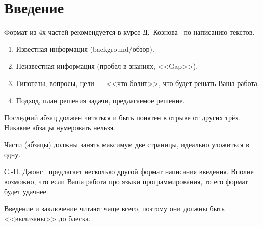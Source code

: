 
\section*{Введение}
\thispagestyle{withCompileDate}

Формат из 4х частей рекомендуется в курсе Д.~Кознова~\cite{koznov} по написанию текстов.

\begin{enumerate}
    \item Известная информация (background/обзор).
    \item Неизвестная информация (пробел в знаниях, <<Gap>>).
    \item Гипотезы, вопросы, цели --- <<что болит>>, что будет решать Ваша работа.
    \item Подход, план решения задачи, предлагаемое решение.
\end{enumerate}

Последний абзац должен читаться и быть понятен в отрыве от других трёх. Никакие абзацы нумеровать нельзя.

Части (абзацы) должны занять максимум две страницы, идеально уложиться в одну.

С.-П. Джонс~\cite{SPJGreatPaper} предлагает несколько другой формат написания введения.
Вполне возможно, что если Ваша работа про языки программирования, то его формат будет удачнее.

Введение и заключение читают чаще всего, поэтому они должны быть <<вылизаны>> до блеска.

